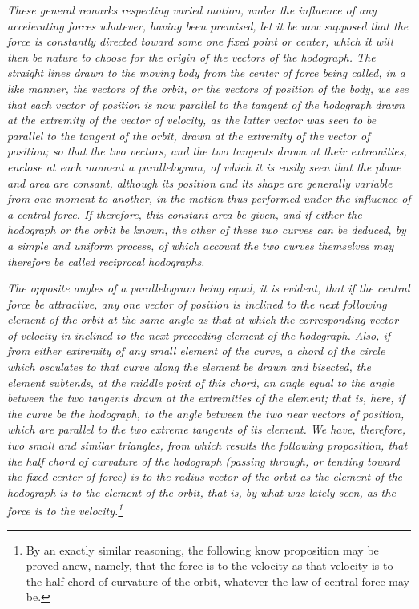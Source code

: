 \documentclass{ximera}
\begin{document}
\emph{These general remarks respecting varied motion, under the influence of \emph{any} accelerating forces whatever, having been premised, let it be now supposed that the force is constantly directed toward some one \emph{fixed point} or \emph{center}, which it will then be nature to choose for the origin of the vectors of the hodograph. The straight lines drawn to the moving body from the center of force being called, in a like manner, the vectors of the orbit, or the \emph{vectors of position} of the body, we see that each vector of position is now parallel to the tangent of the hodograph drawn at the extremity of the vector of velocity, as the latter vector was seen to be parallel to the tangent of the orbit, drawn at the extremity of the vector of position; so that the two vectors, and the two tangents drawn at their extremities, enclose at each moment a \emph{parallelogram}, of which it is easily seen that the \emph{plane and area are consant}, although its position and its shape are generally variable from one moment to another, in the motion thus performed under the influence of a central force. If therefore, this constant area be given, and if either the hodograph or the orbit be known, the other of these two curves can be deduced, by a simple and uniform process, of which account the two curves themselves may therefore be called \emph{reciprocal hodographs}.}

\emph{The opposite angles of a parallelogram being equal, it is evident, that if the central force be attractive, any one vector of position is inclined to the next following element of the orbit at the same angle as that at which the corresponding vector of velocity in inclined to the next preceeding element of the hodograph. Also, if from either extremity of any small element of the curve, a chord of the circle which osculates to that curve along the element be drawn and bisected, the element subtends, at the middle point of this chord, an angle equal to the angle between the two tangents drawn at the extremities of the element; that is, here, if the curve be the hodograph, to the angle between the two near vectors of position, which are parallel to the two extreme tangents of its element. We have, therefore, two small and similar triangles, from which results the following proposition, that \emph{the half chord of curvature of the hodograph} (passing through, or tending toward the fixed center of force) \emph{is to the radius vector of the orbit} as the element of the hodograph is to the element of the orbit, that is, by what was lately seen, \emph{as the force is to the velocity.}\footnote{By an exactly similar reasoning, the following know proposition may be proved anew, namely, that the force is to the velocity as that velocity is to the half chord of curvature of the orbit, whatever the law of central force may be.}}
\end{document}
